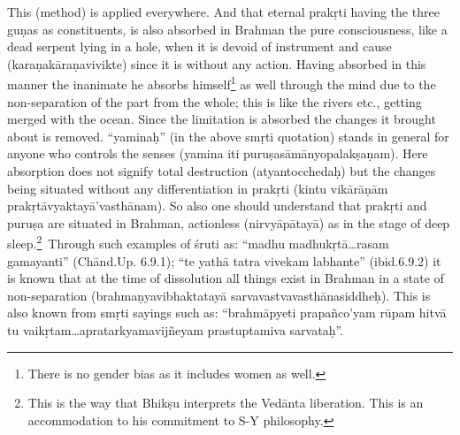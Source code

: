 This (method) is applied everywhere. And that eternal prakṛti having the three guṇas as constituents, is also absorbed in Brahman the pure consciousness, like a dead serpent lying in a hole, when it is devoid of instrument and cause (karaṇakāraṇavivikte) since it is without any action. Having absorbed in this manner the inanimate he absorbs himself\footnote{There is no gender bias as it includes women as well.} as well through the mind due to the non-separation of the part from the whole; this is like the rivers etc., getting merged with the ocean. Since the limitation is absorbed the changes it brought about is removed. “yaminaḥ” (in the above smṛti quotation) stands in general for anyone who controls the senses (yamina iti puruṣasāmānyopalakṣaṇam). Here absorption does not signify total destruction (atyantocchedaḥ) but the changes being situated without any differentiation in prakṛti (kintu vikārāṇām prakṛtāvyaktayā’vasthānam). So also one should understand that prakṛti and puruṣa are situated in Brahman, actionless (nirvyāpātayā) as in the stage of deep sleep.\footnote{This is the way that Bhikṣu interprets the Vedānta liberation. This is an accommodation to his commitment to S-Y philosophy.} Through such examples of śruti as: “madhu madhukṛtā…rasam gamayanti” (Chānd.Up. 6.9.1); “te yathā tatra vivekam labhante” (ibid.6.9.2) it is known that at the time of dissolution all things exist in Brahman in a state of non-separation (brahmaṇyavibhaktatayā sarvavastvavasthānasiddheḥ). This is also known from smṛti sayings such as: “brahmāpyeti prapañco’yam rūpam hitvā tu vaikṛtam…apratarkyamavijñeyam prastuptamiva sarvataḥ”.



